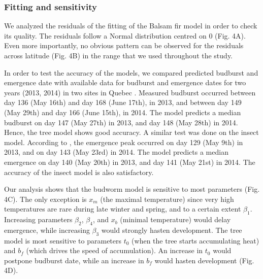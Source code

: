 \documentclass[12 pt]{article}
\begin{document}
\subsubsection{Fitting and sensitivity}
We analyzed the residuals of the fitting of the Balsam fir model in order to check its quality. The residuals follow a Normal distribution centred on 0 (Fig. 4A). Even more importantly, no obvious pattern can be observed for the residuals across latitude (Fig. 4B) in the range that we used throughout the study. \par 
In order to test the accuracy of the models, we compared predicted budburst and emergence date with available data for budburst and emergence dates for two years (2013, 2014) in two sites in Quebec \citep{Pureswaran2019}. Measured budburst occurred between day 136 (May 16th) and day 168 (June 17th), in 2013, and between day 149 (May 29th) and day 166 (June 15th), in 2014. The model predicts a median budburst on day 147 (May 27th) in 2013, and day 148 (May 28th) in 2014. Hence, the tree model shows good accuracy.    A similar test was done on the insect model. According to \cite{Pureswaran2019}, the emergence peak occurred on day 129 (May 9th) in 2013, and on day 143 (May 23rd) in 2014. The model predicts a median emergence on day 140 (May 20th) in 2013, and day 141 (May 21st) in 2014. The accuracy of the insect model is also satisfactory. \par 
Our analysis shows that the budworm model is sensitive to most parameters (Fig. 4C). The only exception is $x_m$ (the maximal temperature) since very high temperatures are rare during late winter and spring, and to a certain extent $\beta _1$. Increasing parameters $\beta _2$, $\beta _4$, and $x_b$ (minimal temperature) would delay emergence, while increasing $ \beta _3$ would strongly hasten development. The tree model is most sensitive to parameters $t_0$ (when the tree starts accumulating heat) and $b_f$ (which drives the speed of accumulation). An increase in $t_0$ would postpone budburst date, while an increase in $b_f$ would hasten development (Fig. 4D).
\end{document}
